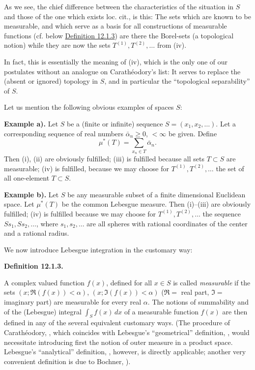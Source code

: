 \documentclass[12pt,b5paper,twoside]{article}
\newcommand{\Definition}[1]{%
  \par\smallskip\noindent\phantomsection\label{def:#1}\textbf{Definition #1.}\enspace
}
\newcommand{\defref}[1]{\hyperref[def:#1]{Definition #1}}
\begin{document}
As we see, the chief difference between the characteristics of the situation in
$S$ and those of the one which exists loc. cit., is this: The sets which are
known to be measurable, and which serve as a basis for all constructions of
measurable functions (cf. below \defref{12.1.3}) are there the Borel-sets (a
topological notion) while they are now the sets
$T^{(1)},T^{(2)},\ldots$ from (iv).

In fact, this is essentially the meaning of (iv), which is the only one of our
postulates without an analogue on Carath\'eodory's list: It serves to replace
the (absent or ignored) topology in $S$, and in particular the ``topological
separability'' of $S$.

Let us mention the following obvious examples of spaces $S$:

\textbf{Example a).} Let $S$ be a (finite or infinite) sequence
$S=(x_1,x_2,\ldots)$. Let a corresponding sequence of real numbers
$\bar\alpha_n\geq0$, $<\infty$ be given. Define
\[
 \mu^*(T)=\sum_{x_n\in T}\bar\alpha_n.
\]
Then (i), (ii) are obviously fulfilled; (iii) is fulfilled because all sets
$T\subset S$ are measurable; (iv) is fulfilled, because we may choose for
$T^{(1)},T^{(2)},\ldots$ the set of all one-element $T\subset S$.

\textbf{Example b).} Let $S$ be any measurable subset of a finite dimensional
Euclidean space. Let $\mu^*(T)$ be the common Lebesgue measure. Then
(i)--(iii) are obviously fulfilled; (iv) is fulfilled because we may choose for
$T^{(1)},T^{(2)},\ldots$ the sequence $Ss_1,Ss_2,\ldots$, where
$s_1,s_2,\ldots$ are all spheres with rational coordinates of the center and a
rational radius.

We now introduce Lebesgue integration in the customary way:

\Definition{12.1.3}
A complex valued function $f(x)$, defined for all $x\in S$ is called
\emph{measurable} if the sets
$(x;\Re(f(x))<\alpha)$, $(x;\Im(f(x))<\alpha)$
($\Re=$ real part, $\Im=$ imaginary part) are measurable for every real
$\alpha$. The notions of summability and of the (Lebesgue) integral
$\int_Sf(x)\,dx$ of a measurable function $f(x)$ are then defined in any of the
several equivalent customary ways. (The procedure of Carath\'eodory,
\cite[pp.~418--427]{ref4}, which coincides with Lebesgue's ``geometrical''
definition, \cite[pp.~116--120]{ref10}, would necessitate introducing first the
notion of outer measure in a product space. Lebesgue's ``analytical''
definition, \cite[pp.~112--116]{ref10}, however, is directly applicable;
another very convenient definition is due to Bochner,
\cite[pp.~265--267]{ref2}).
\end{document}
